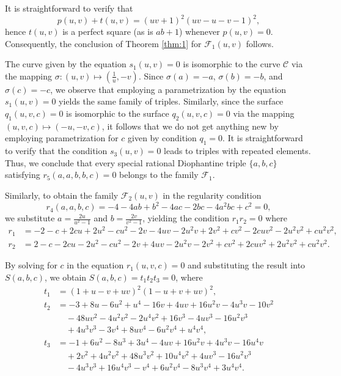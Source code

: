 \documentclass[a4paper]{amsart}
\theoremstyle{plain}
\theoremstyle{definition}
\begin{document}
It is straightforward to verify that
$$p(u,v)+t(u,v)=(uv+1)^2(uv-u-v-1)^2,$$
hence $t(u,v)$ is a perfect square (as is $ab+1$) whenever $p(u,v)=0$. Consequently,  the conclusion of Theorem \ref{thm:1} for $\mathcal{F}_1(u,v)$ follows.

The curve given by the equation $s_1(u,v)=0$ is isomorphic to the curve $\mathcal{C}$ via the mapping $\sigma:(u,v)\mapsto (\frac{1}{u},-v)$. Since $\sigma(a)=-a$, $\sigma(b)=-b$, and $\sigma(c)=-c$, we observe that employing a parametrization by the equation $s_1(u,v)=0$ yields the same family of triples. Similarly, since the surface $q_1(u,v,c)=0$ is isomorphic to the surface $q_2(u,v,c)=0$ via the mapping $(u,v,c)\mapsto (-u,-v,c)$, it follows that we do not get anything new by employing parametrization for $c$ given by condition $q_1=0$. It is straightforward to verify that the condition $s_3(u,v)=0$ leads to triples with repeated elements. Thus, we conclude that every special rational Diophantine triple $\{a,b,c\}$ satisfying $r_5(a,a,b,b,c)=0$ belongs to the family $\mathcal{F}_1$.

Similarly, to obtain the family $\mathcal{F}_2(u,v)$ in the regularity condition
\begin{equation}\label{eg:reg}
r_4(a,a,b,c)=-4 - 4ab + b^2 - 4ac - 2bc - 4a^2bc + c^2=0,
\end{equation}
we substitute $a=\frac{2u}{u^2-1}$ and $b=\frac{2v}{v^2-1}$,  yielding the condition  $r_1 r_2=0$ where
\begin{align*}
	r_1 &= -2 - c + 2cu + 2u^2 - cu^2 - 2v - 4uv - 2u^2v + 2v^2 + cv^2 - 2cuv^2 - 2u^2v^2 + cu^2v^2, \\
	r_2 &= 2 - c - 2cu - 2u^2 - cu^2 - 2v + 4uv - 2u^2v - 2v^2 + cv^2 + 2cuv^2 + 2u^2v^2 + cu^2v^2.
\end{align*}




By solving for $c$ in the equation $r_1(u,v,c)=0$ and substituting the result into $S(a,b,c)$, we obtain $S(a,b,c)=t_1 t_2 t_3=0$, where
\begin{align*}
	t_1 &= (1 + u - v + uv)^2 (1 - u + v + uv)^2, \\
	t_2 &= -3 + 8u - 6u^2 + u^4 - 16v + 4uv + 16u^2v - 4u^3v - 10v^2 \\
	& \quad - 48uv^2 - 4u^2v^2 - 2u^4v^2 + 16v^3 - 4uv^3 - 16u^2v^3 \\
	& \quad + 4u^3v^3 - 3v^4 + 8uv^4 - 6u^2v^4 + u^4v^4, \\
	t_3 &= -1 + 6u^2 - 8u^3 + 3u^4 - 4uv + 16u^2v + 4u^3v - 16u^4v \\
	& \quad + 2v^2 + 4u^2v^2 + 48u^3v^2 + 10u^4v^2 + 4uv^3 - 16u^2v^3 \\
	& \quad - 4u^3v^3 + 16u^4v^3 - v^4 + 6u^2v^4 - 8u^3v^4 + 3u^4v^4.
\end{align*}
\end{document}
